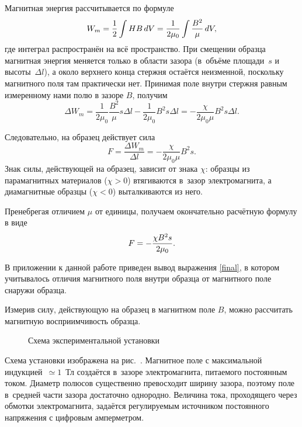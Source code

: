 Магнитная энергия рассчитывается по формуле
\begin{equation}%
	\eqmark{energy}
	W_m=\frac12\int H B\,dV=\frac{1}{2\mu_0}\int\frac{B^2}{\mu}\,dV,
\end{equation}
где интеграл распространён на всё пространство. При смещении образца магнитная энергия меняется только в области зазора
(в~объёме площади~$s$ и высоты~$\Delta l$), а около верхнего конца стержня остаётся неизменной, поскольку магнитного поля там
практически нет. Принимая поле внутри стержня равным измеренному нами полю в зазоре $B$, получим
\begin{equation*}
	\Delta W_m=\frac{1}{2\mu_0}\frac{B^2}{\mu}s\Delta l-\frac{1}{2\mu_0}B^2 s\Delta l=-\frac{\chi}{2\mu_0\mu}B^2s\Delta l.
\end{equation*}

Следовательно, на образец действует сила
\begin{equation}%
	F=\frac{\Delta W_m}{\Delta l}=-\frac{\chi}{2\mu_0\mu}B^2s.
\end{equation}
Знак силы, действующей на образец, зависит от знака $\chi$: образцы из парамагнитных материалов ($\chi>0$) втягиваются
в~зазор электромагнита, а диамагнитные образцы ($\chi<0$) выталкиваются  из него.

Пренебрегая отличием $\mu$ от единицы, получаем окончательно расчётную формулу в виде
\begin{equation}%
	\eqmark{final}
	F=-\frac{\chi B^2s}{2\mu_0}.
\end{equation}

В приложении к данной работе приведен вывод выражения \eqref{final}, в котором учитывалось отличия магнитного поля внутри образца от магнитного поле снаружи образца.

Измерив силу, действующую на образец в магнитном поле $B$, можно рассчитать магнитную восприимчивость образца.

\experiment
\begin{figure}[h!]
	\caption{Схема экспериментальной установки}
\end{figure}

Схема установки изображена на рис.~. Магнитное поле с максимальной индукцией~${\simeq}1$~Тл создаётся в~зазоре
электромагнита, питаемого постоянным током. Диаметр полюсов существенно превосходит ширину зазора, поэтому поле
в~средней части зазора достаточно однородно. Величина тока, проходящего  через обмотки электромагнита, 
задаётся регулируемым источником постоянного напряжения с цифровым амперметром.


